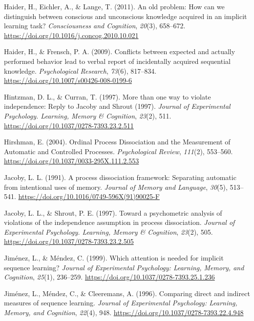 \documentclass[english,,man]{apa6}
\begin{document}
\leavevmode\hypertarget{ref-haider_old_2011}{}%
Haider, H., Eichler, A., \& Lange, T. (2011). An old problem: How can we distinguish between conscious and unconscious knowledge acquired in an implicit learning task? \emph{Consciousness and Cognition}, \emph{20}(3), 658--672. \url{https://doi.org/10.1016/j.concog.2010.10.021}

\leavevmode\hypertarget{ref-haider_conflicts_2009}{}%
Haider, H., \& Frensch, P. A. (2009). Conflicts between expected and actually performed behavior lead to verbal report of incidentally acquired sequential knowledge. \emph{Psychological Research}, \emph{73}(6), 817--834. \url{https://doi.org/10.1007/s00426-008-0199-6}

\leavevmode\hypertarget{ref-hintzman_more_1997}{}%
Hintzman, D. L., \& Curran, T. (1997). More than one way to violate independence: Reply to Jacoby and Shrout (1997). \emph{Journal of Experimental Psychology. Learning, Memory \& Cognition}, \emph{23}(2), 511. \url{https://doi.org/10.1037/0278-7393.23.2.511}

\leavevmode\hypertarget{ref-hirshman_ordinal_2004}{}%
Hirshman, E. (2004). Ordinal Process Dissociation and the Measurement of Automatic and Controlled Processes. \emph{Psychological Review}, \emph{111}(2), 553--560. \url{https://doi.org/10.1037/0033-295X.111.2.553}

\leavevmode\hypertarget{ref-jacoby_process_1991}{}%
Jacoby, L. L. (1991). A process dissociation framework: Separating automatic from intentional uses of memory. \emph{Journal of Memory and Language}, \emph{30}(5), 513--541. \url{https://doi.org/10.1016/0749-596X(91)90025-F}

\leavevmode\hypertarget{ref-jacoby_toward_1997}{}%
Jacoby, L. L., \& Shrout, P. E. (1997). Toward a psychometric analysis of violations of the independence assumption in process dissociation. \emph{Journal of Experimental Psychology. Learning, Memory \& Cognition}, \emph{23}(2), 505. \url{https://doi.org/10.1037/0278-7393.23.2.505}

\leavevmode\hypertarget{ref-jimenez_which_1999}{}%
Jiménez, L., \& Méndez, C. (1999). Which attention is needed for implicit sequence learning? \emph{Journal of Experimental Psychology: Learning, Memory, and Cognition}, \emph{25}(1), 236--259. \url{https://doi.org/10.1037/0278-7393.25.1.236}

\leavevmode\hypertarget{ref-jimenez_comparing_1996}{}%
Jiménez, L., Méndez, C., \& Cleeremans, A. (1996). Comparing direct and indirect measures of sequence learning. \emph{Journal of Experimental Psychology: Learning, Memory, and Cognition}, \emph{22}(4), 948. \url{https://doi.org/10.1037/0278-7393.22.4.948}
\end{document}
